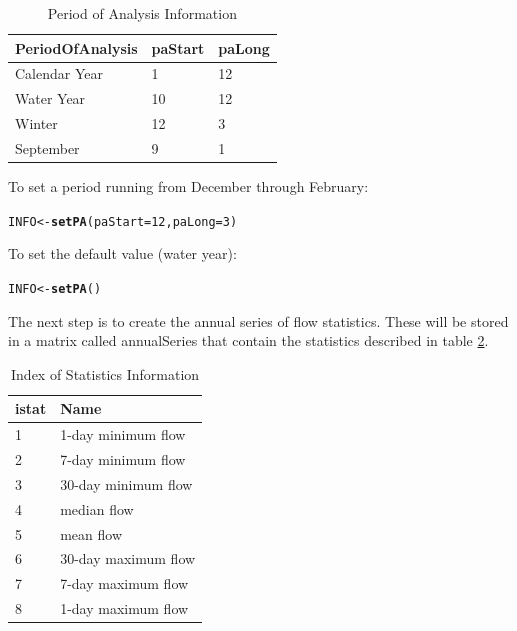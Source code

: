 \documentclass[a4paper,11pt]{article}\usepackage{graphicx, color}
\makeatletter
\newcommand{\hlfunctioncall}[1]{\textcolor[rgb]{0.501960784313725,0,0.329411764705882}{\textbf{#1}}}%
\newenvironment{kframe}{%
 \def\at@end@of@kframe{}%
 \ifinner\ifhmode%
  \def\at@end@of@kframe{\end{minipage}}%
  \begin{minipage}{\columnwidth}%
 \fi\fi%
 \def\FrameCommand##1{\hskip\@totalleftmargin \hskip-\fboxsep
 \colorbox{shadecolor}{##1}\hskip-\fboxsep
     \hskip-\linewidth \hskip-\@totalleftmargin \hskip\columnwidth}%
 \MakeFramed {\advance\hsize-\width
   \@totalleftmargin\z@ \linewidth\hsize
   \@setminipage}}%
 {\par\unskip\endMakeFramed%
 \at@end@of@kframe}
\newenvironment{knitrout}{}{} %
\makeatother
\begin{document}
\begin{table}[!ht]
\centering
\caption{Period of Analysis Information} 
\label{table:paINFO}
\begin{tabular}{lll}
  \hline
PeriodOfAnalysis & paStart & paLong \\ 
  \hline
Calendar Year & 1 & 12 \\ 
  Water Year & 10 & 12 \\ 
  Winter & 12 & 3 \\ 
  September & 9 & 1 \\ 
   \hline
\end{tabular}
\end{table}

To set a period running from December through February:
\begin{knitrout}
\color{fgcolor}\begin{kframe}
\begin{alltt}
INFO <- \hlfunctioncall{setPA}(paStart=12,paLong=3)
\end{alltt}
\end{kframe}
\end{knitrout}


To set the default value (water year):
\begin{knitrout}
\color{fgcolor}\begin{kframe}
\begin{alltt}
INFO <- \hlfunctioncall{setPA}()
\end{alltt}
\end{kframe}
\end{knitrout}


The next step is to create the annual series of flow statistics.  These will be stored in a matrix called annualSeries that contain the statistics described in table \ref{table:istat}.

\begin{table}[!ht]
\centering
\caption{Index of Statistics Information} 
\label{table:istat}
\begin{tabular}{ll}
  \hline
istat & Name \\ 
  \hline
1 & 1-day minimum flow \\ 
  2 & 7-day minimum flow \\ 
  3 & 30-day minimum flow \\ 
  4 & median flow \\ 
  5 & mean flow \\ 
  6 & 30-day maximum flow \\ 
  7 & 7-day maximum flow \\ 
  8 & 1-day maximum flow \\ 
   \hline
\end{tabular}
\end{table}
\end{document}
